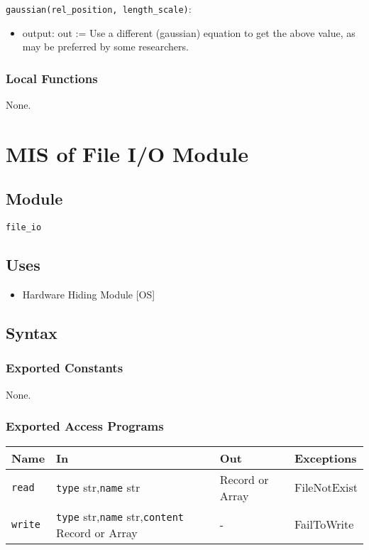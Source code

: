 \documentclass[12pt, titlepage]{article}
\begin{document}
\noindent \texttt{gaussian(rel\_position, length\_scale)}:
\begin{itemize}
  \item output: out := Use a different (gaussian) equation to get the above value, as may be preferred by some researchers.
\end{itemize}

\subsubsection{Local Functions}

None.


\newpage
\section{MIS of File I/O Module} \label{mFile} 

\subsection{Module}
\texttt{file\_io}

\subsection{Uses}
\begin{itemize}
\item Hardware Hiding Module [OS]
\end{itemize}

\subsection{Syntax}

\subsubsection{Exported Constants}
None.

\subsubsection{Exported Access Programs}

\begin{center}
\begin{tabular}{p{2cm} p{5cm} p{3cm} p{4cm}}
\hline
\textbf{Name} & \textbf{In} & \textbf{Out} & \textbf{Exceptions} \\
\hline
\texttt{read} & \texttt{type} str,\newline\texttt{name} str & Record or Array & FileNotExist \\
\texttt{write} & \texttt{type} str,\newline\texttt{name} str,\newline\texttt{content} Record or Array & - & FailToWrite \\
\hline
\end{tabular}
\end{center}
\end{document}
